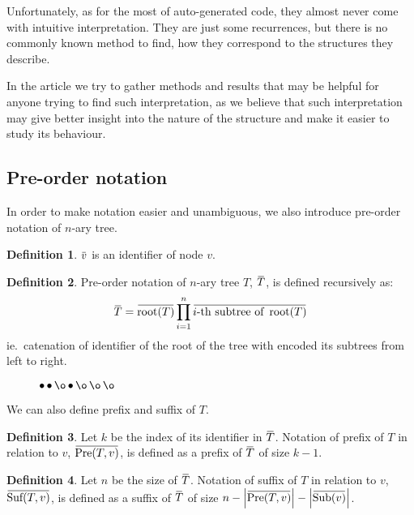 \documentclass[final]{article}
\theoremstyle{definition}
\newtheorem{definition}{Definition}[subsection]
\theoremstyle{remark}
\newcommand{\ols}[1]{\mskip.5\thinmuskip\overline{\mskip-.5\thinmuskip {#1} \mskip-.5\thinmuskip}\mskip.5\thinmuskip} %
\newcommand{\enc}[1]{\ensuremath{\ols{#1}}}
\newcommand{\size}[1]{\ensuremath{\left|#1\right|}}
\DeclareMathOperator{\troot}{\text{root}}
\DeclareMathOperator{\tSub}{\text{Sub}}
\DeclareMathOperator{\tPre}{\text{Pre}}
\DeclareMathOperator{\tSuf}{\text{Suf}}
\DeclareMathOperator{\n}{\bullet}
\DeclareMathOperator{\no}{\o}
\begin{document}
Unfortunately, as for the most of auto-generated code, they almost never come with intuitive interpretation. They are just some recurrences, but there is no commonly known method to find, how they correspond to the structures they describe.

In the article we try to gather methods and results that may be helpful for anyone trying to find such interpretation, as we believe that such interpretation may give better insight into the nature of the structure and make it easier to study its behaviour.

\subsection{Pre-order notation}%
\label{sub:pre_order_notation}



In order to make notation easier and unambiguous, we also introduce pre-order notation of \(n\)-ary tree.

\begin{definition}
    \(\enc{v}\) is an identifier of node \(v\). 
\end{definition}

\begin{definition}
    Pre-order notation of \(n\)-ary tree \(T\), \(\enc{T}\), is defined recursively as:
    \[\enc{T} = \enc{\troot(T)} \prod_{i=1}^{n} \enc{i\text{-th subtree of } \troot(T)}\]
    ie.\ catenation of identifier of the root of the tree with encoded its subtrees from left to right.
\end{definition}

\begin{figure}[h]
    \centering
    
    \caption{\(\n \n \no \n \no \no \no\)}
    \label{fig:oononnn}
\end{figure}

We can also define prefix and suffix of \(T\).

\begin{definition}
    Let \(k\) be the index of its identifier in \enc{T}. Notation of prefix of \(T\) in relation to \(v\), \(\enc{\tPre(T, v)}\), is defined as a prefix of \enc{T} of size \(k - 1\).
\end{definition}

\begin{definition}
    Let \(n\) be the size of \enc{T}. Notation of suffix of \(T\) in relation to \(v\), \(\enc{\tSuf(T, v)}\), is defined as a suffix of \enc{T} of size \(n - \size{\enc{\tPre(T, v)}} - \size{\enc{\tSub(v)}}\).
\end{definition}
\end{document}
